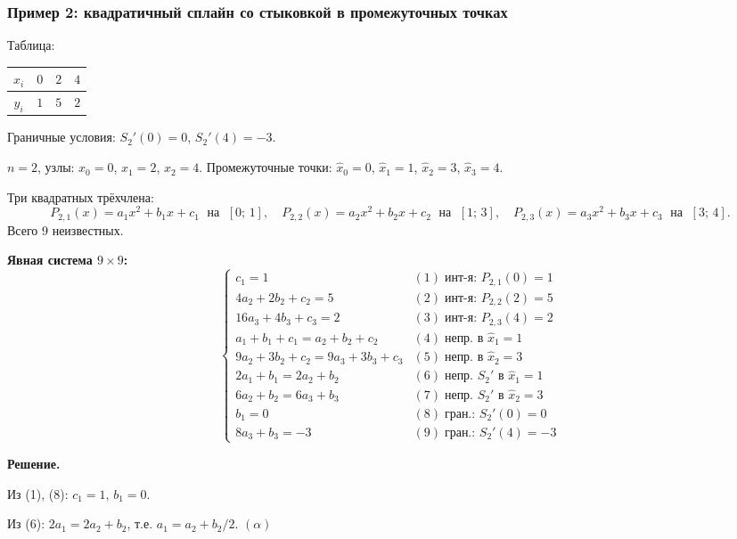 \subsubsection*{Пример 2: квадратичный сплайн со стыковкой в промежуточных точках}

Таблица:

\begin{center}
\begin{tabular}{c|ccc}
    $x_i$ & $0$ & $2$ & $4$ \\
    \hline
    $y_i$ & $1$ & $5$ & $2$
\end{tabular}
\end{center}

Граничные условия: $S_2'(0) = 0$, $S_2'(4) = -3$.

$n = 2$, узлы: $x_0 = 0$, $x_1 = 2$, $x_2 = 4$. Промежуточные точки: $\hat{x}_0 = 0$, $\hat{x}_1 = 1$, $\hat{x}_2 = 3$, $\hat{x}_3 = 4$.

Три квадратных трёхчлена:
\[
    P_{2,1}(x) = a_1 x^2 + b_1 x + c_1 \;\text{ на }\; [0;\, 1], \quad
    P_{2,2}(x) = a_2 x^2 + b_2 x + c_2 \;\text{ на }\; [1;\, 3], \quad
    P_{2,3}(x) = a_3 x^2 + b_3 x + c_3 \;\text{ на }\; [3;\, 4].
\]
Всего 9 неизвестных.

\textbf{Явная система $9 \times 9$:}
\[
    \begin{cases}
        c_1 = 1 & (1) \;\text{инт-я: } P_{2,1}(0) = 1 \\
        4a_2 + 2b_2 + c_2 = 5 & (2) \;\text{инт-я: } P_{2,2}(2) = 5 \\
        16a_3 + 4b_3 + c_3 = 2 & (3) \;\text{инт-я: } P_{2,3}(4) = 2 \\
        a_1 + b_1 + c_1 = a_2 + b_2 + c_2 & (4) \;\text{непр. в } \hat{x}_1 = 1 \\
        9a_2 + 3b_2 + c_2 = 9a_3 + 3b_3 + c_3 & (5) \;\text{непр. в } \hat{x}_2 = 3 \\
        2a_1 + b_1 = 2a_2 + b_2 & (6) \;\text{непр. } S_2' \text{ в } \hat{x}_1 = 1 \\
        6a_2 + b_2 = 6a_3 + b_3 & (7) \;\text{непр. } S_2' \text{ в } \hat{x}_2 = 3 \\
        b_1 = 0 & (8) \;\text{гран.: } S_2'(0) = 0 \\
        8a_3 + b_3 = -3 & (9) \;\text{гран.: } S_2'(4) = -3
    \end{cases}
\]

\textbf{Решение.}

Из (1), (8): $c_1 = 1$, $b_1 = 0$.

Из (6): $2a_1 = 2a_2 + b_2$, т.е. $a_1 = a_2 + b_2/2$. \quad $(\alpha)$

